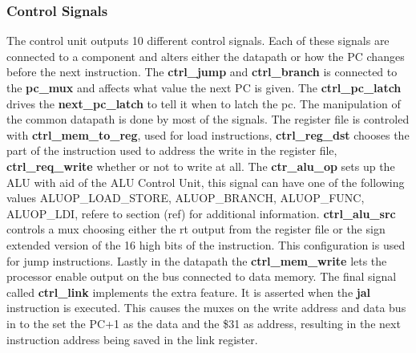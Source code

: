 \subsubsection{Control Signals}

The control unit outputs 10 different control signals. Each of these signals are connected to a component and alters either the datapath
or how the PC changes before the next instruction. The {\bf ctrl\_jump} and {\bf ctrl\_branch} is connected to the {\bf pc\_mux} and 
affects what value the next PC is given. The {\bf ctrl\_pc\_latch} drives the {\bf next\_pc\_latch} to tell it when to latch the pc. 
The manipulation of the common datapath is done by most of the signals. The register file is controled with {\bf ctrl\_mem\_to\_reg}, 
used for load instructions, {\bf ctrl\_reg\_dst} chooses the part of the instruction used to address the write in the register file, 
{\bf ctrl\_req\_write} whether or not to write at all. The {\bf ctr\_alu\_op} sets up the ALU with aid of the ALU Control Unit, this
signal can have one of the following values ALUOP\_LOAD\_STORE, ALUOP\_BRANCH, ALUOP\_FUNC, ALUOP\_LDI, refere to section (ref) for additional information.
{\bf ctrl\_alu\_src} controls a mux choosing either the rt output from the register file or the sign extended version of the 16 high
bits of the instruction. This configuration is used for jump instructions. Lastly in the datapath the {\bf ctrl\_mem\_write} lets the
processor enable output on the bus connected to data memory. The final signal called {\bf ctrl\_link} implements the extra feature. 
It is asserted when the {\bf jal} instruction is executed. This causes the muxes on the write address and data bus in to the set the PC+1
as the data and the \$31 as address, resulting in the next instruction address being saved in the link register. 
